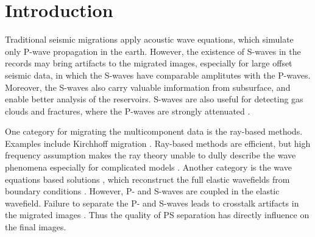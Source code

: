 \documentclass[manuscript,ulem,graphix,revised]{geophysics}
\begin{document}
\section{Introduction}
Traditional seismic migrations apply acoustic wave equations, which simulate only P-wave propagation in the earth. However, the existence of S-waves in the records may bring artifacts to the migrated images, 
especially for large offset seismic data, in which the S-waves have comparable amplitutes with the P-waves.
Moreover, the S-waves also carry valuable imformation from subsurface, and enable better analysis of the reservoirs. S-waves are also useful for detecting gas clouds and fractures, where the P-waves are strongly attenuated \citep{li98, knapp01}.


One category for migrating the multicomponent data is the ray-based methods. Examples include Kirchhoff migration \citep{kuo84, dai86, hokstad00}.
Ray-based methods are efficient, but high frequency assumption makes the ray theory unable to dully describe the wave phenomena especially for complicated models \citep{gray01}.
Another category is the wave equations based solutions \citep{chang86,chang94,whitmore95}, which reconstruct the full elastic wavefields from boundary conditions \citep{wapenaar90}. 
However, P- and S-waves are coupled in the elastic wavefield. Failure to separate the P- and S-waves leads to crosstalk artifacts in the migrated images \citep{yan08}. Thus the quality of PS separation has directly influence on the final images. 
\end{document}
